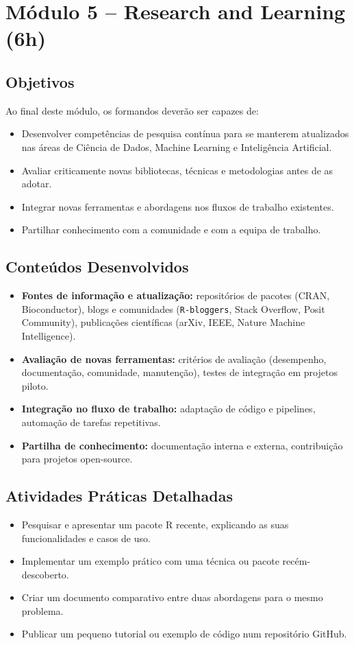 \section{\textcolor{sectionred}{Módulo 5 – Research and Learning (6h)}}

\subsection{\textcolor{subsectionblue}{Objetivos}}
Ao final deste módulo, os formandos deverão ser capazes de:
\begin{itemize}
  \item Desenvolver competências de pesquisa contínua para se manterem atualizados nas áreas de Ciência de Dados, Machine Learning e Inteligência Artificial.  
  \item Avaliar criticamente novas bibliotecas, técnicas e metodologias antes de as adotar.  
  \item Integrar novas ferramentas e abordagens nos fluxos de trabalho existentes.  
  \item Partilhar conhecimento com a comunidade e com a equipa de trabalho.
\end{itemize}

\subsection{\textcolor{subsectionblue}{Conteúdos Desenvolvidos}}
\begin{itemize}
  \item \textbf{Fontes de informação e atualização:} repositórios de pacotes (CRAN, Bioconductor), blogs e comunidades (\texttt{R-bloggers}, Stack Overflow, Posit Community), publicações científicas (arXiv, IEEE, Nature Machine Intelligence).
  \item \textbf{Avaliação de novas ferramentas:} critérios de avaliação (desempenho, documentação, comunidade, manutenção), testes de integração em projetos piloto.
  \item \textbf{Integração no fluxo de trabalho:} adaptação de código e pipelines, automação de tarefas repetitivas.
  \item \textbf{Partilha de conhecimento:} documentação interna e externa, contribuição para projetos open-source.
\end{itemize}

\subsection{\textcolor{subsectionblue}{Atividades Práticas Detalhadas}}
\begin{itemize}
  \item Pesquisar e apresentar um pacote R recente, explicando as suas funcionalidades e casos de uso.
  \item Implementar um exemplo prático com uma técnica ou pacote recém-descoberto.
  \item Criar um documento comparativo entre duas abordagens para o mesmo problema.
  \item Publicar um pequeno tutorial ou exemplo de código num repositório GitHub.
\end{itemize}

